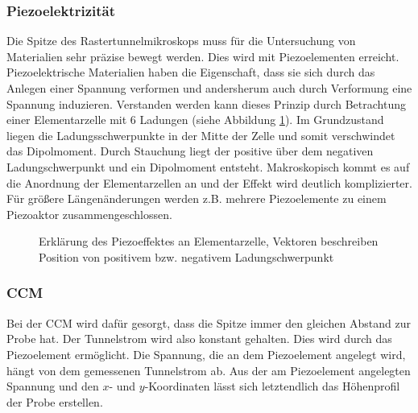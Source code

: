 \subsubsection{Piezoelektrizität}
Die Spitze des Rastertunnelmikroskops muss für die Untersuchung von Materialien sehr präzise bewegt werden. Dies wird mit Piezoelementen erreicht. Piezoelektrische Materialien haben die Eigenschaft, dass sie sich durch das Anlegen einer Spannung verformen und andersherum auch durch Verformung eine Spannung induzieren. Verstanden werden kann dieses Prinzip durch Betrachtung einer Elementarzelle mit 6 Ladungen (siehe Abbildung \ref{fig:piezo}). Im Grundzustand liegen die Ladungsschwerpunkte in der Mitte der Zelle und somit verschwindet das Dipolmoment. Durch Stauchung liegt der positive über dem negativen Ladungschwerpunkt und ein Dipolmoment entsteht. Makroskopisch kommt es auf die Anordnung der Elementarzellen an und der Effekt wird deutlich komplizierter. Für größere Längenänderungen werden z.B. mehrere Piezoelemente zu einem Piezoaktor zusammengeschlossen.

\begin{figure}[h]
  \centering
  \caption{Erklärung des Piezoeffektes an Elementarzelle, Vektoren beschreiben Position von positivem bzw. negativem Ladungschwerpunkt}
  \label{fig:piezo}
\end{figure}

\subsubsection{CCM}
Bei der CCM wird dafür gesorgt, dass die Spitze immer den gleichen Abstand zur Probe hat. Der Tunnelstrom wird also konstant gehalten. Dies wird durch das Piezoelement ermöglicht. Die Spannung, die an dem Piezoelement angelegt wird, hängt von dem gemessenen Tunnelstrom ab. Aus der am Piezoelement angelegten Spannung und den $x$- und $y$-Koordinaten lässt sich letztendlich das Höhenprofil der Probe erstellen.

